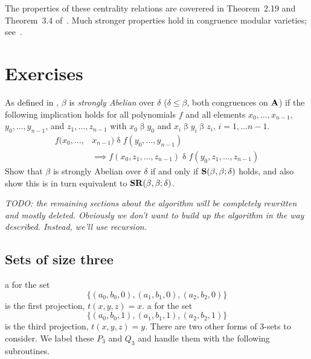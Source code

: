   The properties of these centrality relations are coverered in
  Theorem~2.19 and Theorem~3.4 of~\cite{KearnesKiss2013}. Much stronger
  properties hold in congruence modular varieties;
  see~\cite{FreeseMcKenzie1987}.

  \section*{Exercises}

  \begin{exercises}

  \prob
  As defined in \cite{HobbyMcKenzie1988}, $\beta$ is \emph{strongly
  Abelian} over $\delta$ ($\delta \leq \beta$, both congruences on $\mathbf{A}$)
  if the following implication holds for all polynomials $f$ and all
  elements $x_0, \ldots, x_{n-1}$, $y_0, \ldots, y_{n-1}$, and
  $z_1, \ldots, z_{n-1}$ with $x_0 \mathrel\beta y_0$ and
  $x_i \mathrel\beta y_i \mathrel\beta z_i$, $i = 1, \ldots n-1$.
  \begin{align*}
  f(x_0,\ldots,&x_{n-1}) \mathrel\delta f(y_0,\ldots,y_{n-1}) \\
  &\implies
  f(x_0, z_1,\ldots,z_{n-1}) \mathrel\delta f(y_0, z_1,\ldots,z_{n-1})
  \end{align*}
  Show that $\beta$ is strongly
  Abelian over $\delta$ if and only if $\mathbf{S}(\beta,\beta;\delta)$
  holds, and also show this is in turn equivalent to
  $\mathbf{SR}(\beta,\beta;\delta)$.
  \end{exercises}




  \noindent \emph{TODO: the remaining sections about the algorithm will be completely
  rewritten and mostly deleted.  Obviously we don't want to build up the
  algorithm in the way described.  Instead, we'll use recursion.}

  \subsection{Sets of size three}
  a \ldto for the set
  \begin{equation*}
  \{(a_0,b_0, 0), (a_1, b_1, 0), (a_2, b_2, 0)\}
  \end{equation*}
  is the first projection, $t(x,y,z) = x$.
  a \ldto for the set
  \begin{equation*}
  \{(a_0,b_0,1), (a_1, b_1, 1), (a_2, b_2, 1)\}
  \end{equation*}
  is the third projection, $t(x,y,z) = y$.
  There are two other forms of 3-sets to consider.
  We label these $P_3$ and $Q_3$ and handle them with
  the following subroutines.


